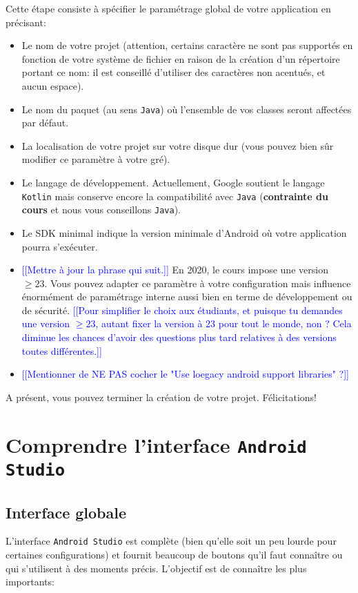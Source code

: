 \documentclass[a4paper,10pt]{article}
\begin{document}
Cette étape consiste à spécifier le paramétrage global de votre application en précisant:
\begin{itemize}
	\item Le nom de votre projet (attention, certains caractère ne sont pas supportés en fonction de votre système de fichier en raison de la création d'un répertoire portant ce nom: il est conseillé d'utiliser des caractères non acentués, et aucun espace).
	\item Le nom du paquet (au sens \texttt{Java}) où l'ensemble de vos classes seront affectées par défaut.
	\item La localisation de votre projet sur votre disque dur (vous pouvez bien sûr modifier ce paramètre à votre gré).
	\item Le langage de développement. Actuellement, Google soutient le langage \texttt{Kotlin} mais conserve encore la compatibilité avec \texttt{Java} (\textbf{contrainte du cours} et nous vous conseillons \texttt{Java}).
	\item Le SDK minimal indique la version minimale d'Android où votre application pourra s'exécuter. \item \textcolor{blue}{[[Mettre à jour la phrase qui suit.]]} En 2020, le cours impose une version $\geq 23$. Vous pouvez adapter ce paramètre à votre configuration mais influence énormément de paramétrage interne aussi bien en terme de développement ou de sécurité. \textcolor{blue}{[[Pour simplifier le choix aux étudiants, et puisque tu demandes une version $\geq 23$, autant fixer la version à 23 pour tout le monde, non ? Cela diminue les chances d'avoir des questions plus tard relatives à des versions toutes différentes.]]}
	\item \textcolor{blue}{[[Mentionner de NE PAS cocher le "Use loegacy android support libraries" ?]]}
\end{itemize}

A présent, vous pouvez terminer la création de votre projet. Félicitations!


\section{Comprendre l'interface \texttt{Android Studio}}

\subsection{Interface globale}

L'interface \texttt{Android Studio} est complète (bien qu'elle soit un peu lourde pour certaines configurations) et fournit beaucoup de boutons qu'il faut connaître ou qui s'utilisent à des moments précis. L'objectif est de connaître les plus importants:
\end{document}
